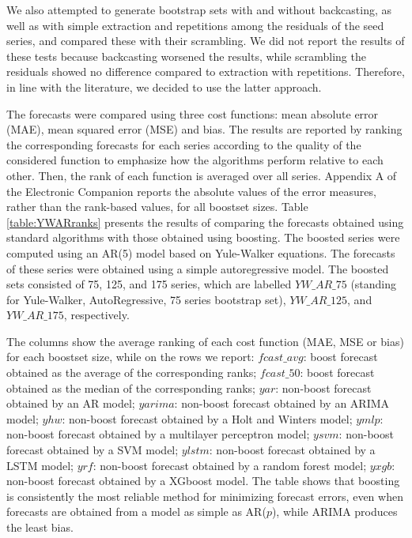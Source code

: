 \documentclass[11pt]{article}
\begin{document}
We also attempted to generate bootstrap sets with and without backcasting, as well as with simple extraction and repetitions among the residuals of the seed series, and compared these with their scrambling. We did not report the results of these tests because backcasting worsened the results, while scrambling the residuals showed no difference compared to extraction with repetitions. Therefore, in line with the literature, we decided to use the latter approach.

The forecasts were compared using three cost functions: mean absolute error (MAE), mean squared error (MSE) and bias. The results are reported by ranking the corresponding forecasts for each series according to the quality of the considered function to emphasize how the algorithms perform relative to each other. Then, the rank of each function is averaged over all series. Appendix A of the Electronic Companion reports the absolute values of the error measures, rather than the rank-based values, for all boostset sizes. 
Table \ref{table:YWARranks} presents the results of comparing the forecasts obtained using standard algorithms with those obtained using boosting. The boosted series were computed using an AR(5) model based on Yule-Walker equations. The forecasts of these series were obtained using a simple autoregressive model. The boosted sets consisted of 75, 125, and 175 series, which are labelled $YW\_AR\_75$ (standing for Yule-Walker, AutoRegressive, 75 series bootstrap set), $YW\_AR\_125$, and $YW\_AR\_175$, respectively.

The columns show the average ranking of each cost function (MAE, MSE or bias) for each boostset size, while on the rows we report:
	 $fcast\_avg$: boost forecast obtained as the average of the corresponding ranks;
	 $fcast\_50$: boost forecast obtained as the median of the corresponding ranks;
	 $yar$: non-boost forecast obtained by an AR model;
	 $yarima$: non-boost forecast obtained by an ARIMA model;
	 $yhw$: non-boost forecast obtained by a Holt and Winters model;
	 $ymlp$: non-boost forecast obtained by a multilayer perceptron model;
	 $ysvm$: non-boost forecast obtained by a SVM model;
	 $ylstm$: non-boost forecast obtained by a LSTM model;
	 $yrf$: non-boost forecast obtained by a random forest model;
	 $yxgb$: non-boost forecast obtained by a XGboost model.
The table shows that boosting is consistently the most reliable method for minimizing forecast errors, even when forecasts are obtained from a model as simple as AR($p$), while ARIMA produces the least bias.
\end{document}
